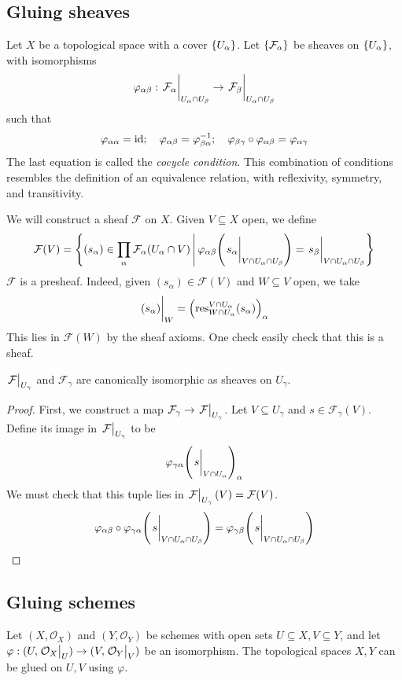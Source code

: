 \subsection{Gluing sheaves}
Let \( X \) be a topological space with a cover \( \qty{U_\alpha} \).
Let \( \qty{\mathcal F_\alpha} \) be sheaves on \( \qty{U_\alpha} \), with isomorphisms
\[ \varphi_{\alpha\beta} : \eval{\mathcal F_\alpha}_{U_\alpha \cap U_\beta} \to \eval{\mathcal F_\beta}_{U_\alpha \cap U_\beta} \]
such that
\[ \varphi_{\alpha\alpha} = \operatorname{id};\quad \varphi_{\alpha\beta} = \varphi_{\beta\alpha}^{-1};\quad \varphi_{\beta\gamma} \circ \varphi_{\alpha\beta} = \varphi_{\alpha\gamma} \]
The last equation is called the \emph{cocycle condition}.
This combination of conditions resembles the definition of an equivalence relation, with reflexivity, symmetry, and transitivity.

We will construct a sheaf \( \mathcal F \) on \( X \).
Given \( V \subseteq X \) open, we define
\[ \mathcal F(V) = \qty{(s_\alpha) \in \prod_\alpha \mathcal F_\alpha(U_\alpha \cap V) \midd \varphi_{\alpha\beta}\qty(\eval{s_\alpha}_{V \cap U_\alpha \cap U_\beta}) = \eval{s_\beta}_{V \cap U_\alpha \cap U_\beta}} \]
\( \mathcal F \) is a presheaf.
Indeed, given \( (s_\alpha) \in \mathcal F(V) \) and \( W \subseteq V \) open, we take
\[ \eval{(s_\alpha)}_W = \qty(\res_{W \cap U_\alpha}^{V \cap U_\alpha}(s_\alpha))_\alpha \]
This lies in \( \mathcal F(W) \) by the sheaf axioms.
One check easily check that this is a sheaf.
\begin{proposition}
    \( \eval{\mathcal F}_{U_\gamma} \) and \( \mathcal F_\gamma \) are canonically isomorphic as sheaves on \( U_\gamma \).
\end{proposition}
\begin{proof}
    First, we construct a map \( \mathcal F_\gamma \to \eval{\mathcal F}_{U_\gamma} \).
    Let \( V \subseteq U_\gamma \) and \( s \in \mathcal F_\gamma(V) \).
    Define its image in \( \eval{\mathcal F}_{U_\gamma} \) to be
    \[ \varphi_{\gamma\alpha}\qty(\eval{s}_{V \cap U_\alpha})_\alpha \]
    We must check that this tuple lies in \( \eval{\mathcal F}_{U_\gamma}(V) = \mathcal F(V) \).
    \[ \varphi_{\alpha\beta} \circ \varphi_{\gamma\alpha}\qty(\eval{s}_{V \cap U_\alpha \cap U_\beta}) = \varphi_{\gamma\beta}\qty(\eval{s}_{V \cap U_\alpha \cap U_\beta}) \]
\end{proof}

\subsection{Gluing schemes}
Let \( (X, \mathcal O_X) \) and \( (Y, \mathcal O_Y) \) be schemes with open sets \( U \subseteq X, V \subseteq Y \), and let \( \varphi : (U, \eval{\mathcal O_X}_U) \to (V, \eval{\mathcal O_Y}_V) \) be an isomorphism.
The topological spaces \( X, Y \) can be glued on \( U, V \) using \( \varphi \).


